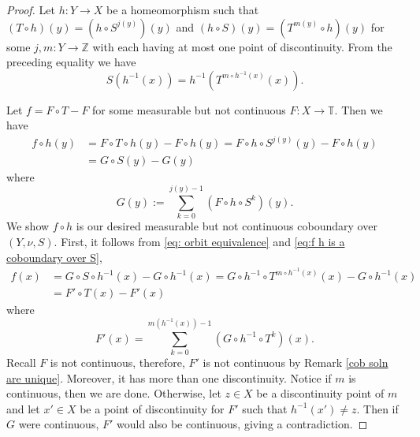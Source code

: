\documentclass[10pt,a4paper]{amsart}
\begin{document}
\begin{proof}
Let $h\colon Y \rightarrow X$ be a homeomorphism such that $(T\circ h)(y)=(h \circ S^{j(y)})(y)$ and $(h \circ S)(y)=(T^{m(y)} \circ h)(y)$ for some $j,m\colon Y \rightarrow \mathbb{Z}$ with each having at most one point of discontinuity. From the preceding equality we have 
\begin{equation}\label{eq: orbit equivalence}
S (h^{-1}(x))= h^{-1}(T ^{m \circ h^{-1}(x)}(x)).
\end{equation}


 Let $f=F\circ T-F$ for some measurable but not continuous $F\colon X \rightarrow \mathbb{T}.$ Then we have
\begin{equation}\label{eq:f h is a coboundary over S}
\begin{aligned}
f\circ h (y)&= F\circ T\circ h(y)-F \circ h(y)= F \circ h \circ S^{j(y)}(y)- F \circ h(y)\\ &= G \circ S(y)-G(y)
\end{aligned}
\end{equation}
where $$G(y):= \sum_{k=0}^{j(y)-1} (F \circ h \circ S^{k})(y).$$ We show $f \circ h$ is our desired measurable but not continuous coboundary over $(Y,\nu,S)$. First, it follows from \eqref{eq: orbit equivalence} and \eqref{eq:f h is a coboundary over S},
\begin{align*}
f(x)&= G \circ S \circ h^{-1} (x)-G \circ h^{-1} (x)= G \circ h^{-1} \circ T^{m \circ h^{-1}(x)}(x) - G \circ h^{-1} (x)\\ &= F' \circ T (x) - F'(x)
\end{align*}
where $${F'}(x)=\sum_{k=0}^{m(h^{-1}(x))-1} (G \circ h^{-1} \circ T^{k})(x).$$ Recall $F$ is not continuous, therefore, ${F'}$ is not continuous by Remark \ref{cob soln are unique}. Moreover, it has more than one discontinuity. Notice if $m$ is continuous, then we are done. Otherwise, let $z\in X$ be a discontinuity point of $m$ and let $x' \in X$ be a point of discontinuity for ${F'}$ such that $ h^{-1}(x') \neq z$. Then if $G$ were continuous, ${F'}$ would also be continuous, giving a contradiction. \end{proof}
\end{document}
